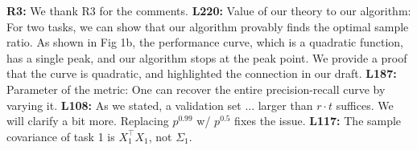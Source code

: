 \documentclass{article}
\begin{document}
\vspace{-0.02in}
\textbf{R3:}
We thank R3 for the comments.
\textbf{L220:} Value of our theory to our algorithm:
For two tasks, we can show that our algorithm provably finds the optimal sample ratio. As shown in Fig 1b, the performance curve, which is a quadratic function, has a single peak, and our algorithm stops at the peak point.
We provide a proof that the curve is quadratic, and highlighted the connection in our draft.
\textbf{L187:} Parameter of the metric: One can recover the entire precision-recall curve by varying it.
\textbf{L108:}
As we stated, a validation set ... larger than $r\cdot t$ suffices.
We will clarify a bit more. Replacing $p^{0.99}$ w/ $p^{0.5}$ fixes the issue.
\textbf{L117:} The sample covariance of task 1 is  $X_1^{\top}X_1$, not $\Sigma_1$.
\end{document}
